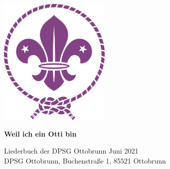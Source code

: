\documentclass[../main.tex]{subfiles}
\begin{document}
\begin{titlepage}
   \begin{center}
       \vspace*{5cm}
       \includegraphics[width=0.4\textwidth]{images/wosm-lily.png}
       
       \vspace{1cm}
       
       \textbf{\Huge Weil ich ein Otti bin}
       
       \vspace{0.5cm}
       
       {\large Liederbuch der DPSG Ottobrunn}
       \vfill
       Juni 2021\\
       DPSG Ottobrunn, Buchenstraße 1, 85521 Ottobrunn    
   \end{center}
\end{titlepage}
\end{document}
